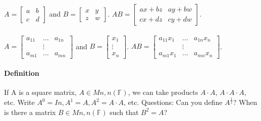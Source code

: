 \documentclass[10pt,letter]{article}
\begin{document}
$A = \begin{bmatrix} a & b  \\ c & d \end{bmatrix}$ and $B = \begin{bmatrix} x & y \\ z & w \end{bmatrix}$. $AB = \begin{bmatrix} ax+bz & ay + bw \\ cx+dz & cy+dw\end{bmatrix}$.  \\ \\ 

$A = \begin{bmatrix} a_{11} & \ldots & a_{1n} \\ &\vdots\\ a_{m1} & \ldots & a_{mn} \end{bmatrix}$ and $B = \begin{bmatrix} x_1 \\ \vdots \\ x_n \end{bmatrix}$. $AB = \begin{bmatrix} a_{11}x_1 & \ldots & a_{1n}x_n \\ &\vdots\\ a_{m1}x_1 & \ldots & a_{mn}x_n \end{bmatrix}$. 

\paragraph{Definition}
If A is a square matrix, $A\in Mn,n(\mathbb{F})$, we can take products $A\cdot A$, $A\cdot A\cdot A$, etc. Write $A^0=In, A^1=A, A^2=A\cdot A$, etc. Questions: Can you define $A^{\frac{1}{2}}$? When is there a matrix $B\in Mn,n(\mathbb{F})$ such that $B^2=A$? 


\section*{}
\end{document}
